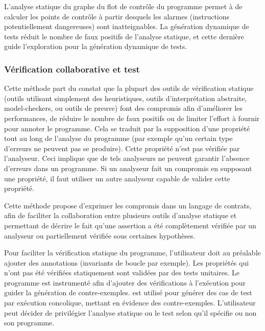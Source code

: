 L'analyse statique du graphe du flot de contrôle du programme permet à
\dyta de calculer les points de contrôle à partir desquels les alarmes
(instructions potentiellement dangereuses) sont inatteignables.
La génération dynamique de tests réduit le nombre de faux positifs de l'analyse
statique, et cette dernière guide l'exploration pour la génération dynamique de
tests.


\subsubsection*{Vérification collaborative et test}


Cette méthode \cite{Christakis/FM12} part du constat que la plupart
des outils de vérification statique (outils utilisant simplement des
heuristiques, outils d'interprétation abstraite, model-checkers, ou outils de
preuve) font des compromis afin d'améliorer les performances, de réduire le
nombre de faux positifs ou de limiter l'effort à fournir pour annoter le
programme. Cela se traduit par la supposition d'une propriété tout au long de
l'analyse du programme (par exemple qu'un certain type d'erreurs ne peuvent pas
se produire).
Cette propriété n'est pas vérifiée par l'analyseur.
Ceci implique que de tels analyseurs ne peuvent garantir l'absence d'erreurs
dans un programme.
Si un analyseur fait un compromis en supposant une propriété, il faut utiliser
un autre analyseur capable de valider cette propriété.

Cette méthode propose d'exprimer les compromis dans un langage de contrats,
afin de faciliter la collaboration entre plusieurs outils d'analyse statique
et permettant de décrire le fait qu'une assertion a été complètement vérifiée
par un analyseur ou partiellement vérifiée sous certaines hypothèses.

Pour faciliter la vérification statique du programme, l'utilisateur doit au
préalable ajouter des annotations (invariants de boucle par exemple). Les
propriétés qui n'ont pas été vérifiées statiquement sont validées par des tests
unitaires. Le programme est instrumenté afin d'ajouter des vérifications à
l'exécution pour guider la génération de contre-exemples. \pex est utilisé pour
générer des cas de test par exécution concolique,
mettant en évidence des contre-exemples. L'utilisateur peut décider de
privilégier l'analyse statique ou le test selon qu'il spécifie ou non son
programme.



